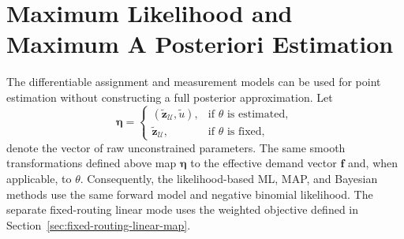 \section{Maximum Likelihood and Maximum A Posteriori Estimation}

The differentiable assignment and measurement models can be used for point estimation
without constructing a full posterior approximation. Let
\[
\bm\eta=
\begin{cases}
(\widetilde{\bm z}_{\mathcal U},\widetilde u), & \text{if $\theta$ is estimated},\\
\widetilde{\bm z}_{\mathcal U}, & \text{if $\theta$ is fixed},
\end{cases}
\]
denote the vector of raw unconstrained parameters. The same smooth transformations
defined above map $\bm\eta$ to the effective demand vector $\bm f$ and, when
applicable, to $\theta$. Consequently, the likelihood-based ML, MAP, and Bayesian
methods use the same forward model and negative binomial likelihood. The separate
fixed-routing linear mode uses the weighted objective defined in
Section~\ref{sec:fixed-routing-linear-map}.

